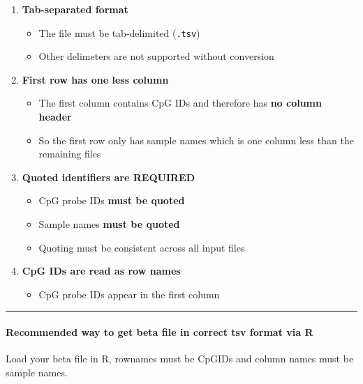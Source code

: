 \documentclass[
]{article}
\providecommand{\tightlist}{%
  \setlength{\itemsep}{0pt}\setlength{\parskip}{0pt}}
\begin{document}
\begin{enumerate}
\def\labelenumi{\arabic{enumi}.}
\tightlist
\item
  \textbf{Tab-separated format}

  \begin{itemize}
  \tightlist
  \item
    The file must be tab-delimited (\texttt{.tsv})
  \item
    Other delimeters are not supported without conversion
  \end{itemize}
\item
  \textbf{First row has one less column}

  \begin{itemize}
  \tightlist
  \item
    The first column contains CpG IDs and therefore has \textbf{no
    column header}
  \item
    So the first row only has sample names which is one column less than
    the remaining files
  \end{itemize}
\item
  \textbf{Quoted identifiers are REQUIRED}

  \begin{itemize}
  \tightlist
  \item
    CpG probe IDs \textbf{must be quoted}
  \item
    Sample names \textbf{must be quoted}
  \item
    Quoting must be consistent across all input files
  \end{itemize}
\item
  \textbf{CpG IDs are read as row names}

  \begin{itemize}
  \tightlist
  \item
    CpG probe IDs appear in the first column
  \end{itemize}
\end{enumerate}

\begin{center}\rule{0.5\linewidth}{0.5pt}\end{center}

\paragraph{Recommended way to get beta file in correct tsv format via
R}\label{recommended-way-to-get-beta-file-in-correct-tsv-format-via-r}

Load your beta file in R, rownames must be CpGIDs and column names must
be sample names.
\end{document}
